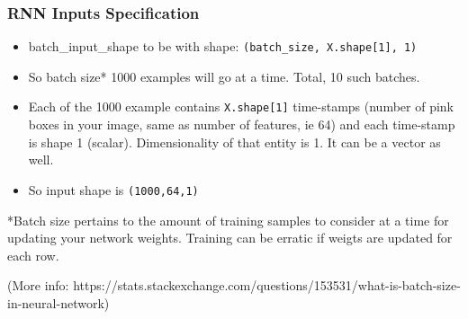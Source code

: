 \begin{frame}[fragile] \frametitle{RNN Inputs Specification}
\begin{itemize}
\item batch\_input\_shape to be with shape: \lstinline|(batch_size, X.shape[1], 1)|
\item So batch size* 1000 examples will go at a time. Total, 10 such batches.
\item Each of the 1000 example contains \lstinline|X.shape[1]| time-stamps (number of pink boxes in your image, same as number of features, ie 64) and each time-stamp is shape 1 (scalar). Dimensionality of that entity is 1. It can be a vector as well.
\item So input shape is \lstinline|(1000,64,1)|
\end{itemize}

*Batch size pertains to the amount of training samples to consider at a time for updating your network weights. Training can be erratic if weigts are updated for each row.

{\tiny (More info: https://stats.stackexchange.com/questions/153531/what-is-batch-size-in-neural-network)}

\end{frame}

